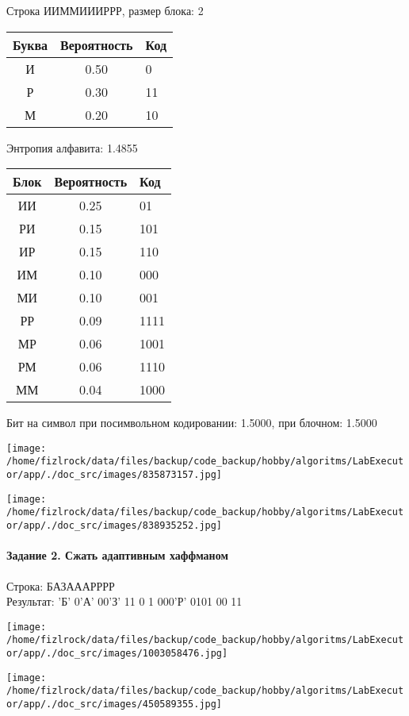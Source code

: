 \documentclass[a4paper, 12pt]{article}
\begin{document}
Строка ИИММИИИРРР, размер блока: 2
\begin{center}
 \begin{tabular}{ |c|c|l| } 
  \hline
     Буква & Вероятность & Код\\ \hline
И & 0.50 & 0\\\hline
Р & 0.30 & 11\\\hline
М & 0.20 & 10
\\ \hline \end{tabular}
\end{center}
Энтропия алфавита: 1.4855
\begin{center}
 \begin{tabular}{ |c|c|l| } 
  \hline
     Блок & Вероятность & Код\\ \hline
ИИ & 0.25 & 01\\\hline
РИ & 0.15 & 101\\\hline
ИР & 0.15 & 110\\\hline
ИМ & 0.10 & 000\\\hline
МИ & 0.10 & 001\\\hline
РР & 0.09 & 1111\\\hline
МР & 0.06 & 1001\\\hline
РМ & 0.06 & 1110\\\hline
ММ & 0.04 & 1000
\\ \hline \end{tabular}
\end{center}
Бит на символ при посимвольном кодировании: 1.5000, при блочном: 1.5000

\texttt{[image: /home/fizlrock/data/files/backup/code\_backup/hobby/algoritms/LabExecutor/app/./doc\_src/images/835873157.jpg]}

\texttt{[image: /home/fizlrock/data/files/backup/code\_backup/hobby/algoritms/LabExecutor/app/./doc\_src/images/838935252.jpg]}
\pagebreak
\paragraph{Задание 2. Сжать адаптивным хаффманом\\}

Строка: 
БАЗАААРРРР\\
Результат: 'Б' 0'А' 00'З' 11 0 1 000'Р' 0101 00 11

\texttt{[image: /home/fizlrock/data/files/backup/code\_backup/hobby/algoritms/LabExecutor/app/./doc\_src/images/1003058476.jpg]}

\texttt{[image: /home/fizlrock/data/files/backup/code\_backup/hobby/algoritms/LabExecutor/app/./doc\_src/images/450589355.jpg]}
\end{document}
